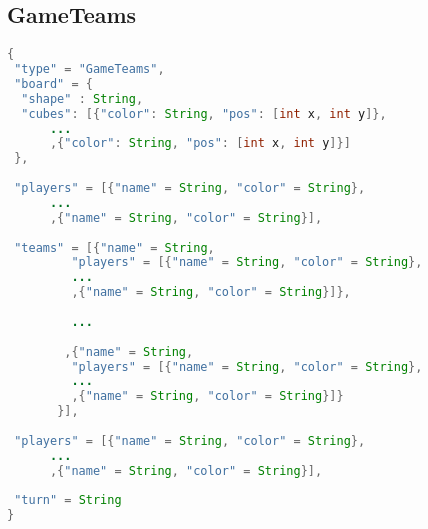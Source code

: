 \documentclass{article}
\begin{document}
\subsection*{GameTeams}
\begin{lstlisting}[frame=single, language=Java]
{
 "type" = "GameTeams",
 "board" = {
  "shape" : String,
  "cubes": [{"color": String, "pos": [int x, int y]},
  	  ...
  	  ,{"color": String, "pos": [int x, int y]}]
 },
 
 "players" = [{"name" = String, "color" = String},
 	  ...
 	  ,{"name" = String, "color" = String}],
 
 "teams" = [{"name" = String,
 	     "players" = [{"name" = String, "color" = String},
 	     ...
 	     ,{"name" = String, "color" = String}]},
 	     
 	     ...
 	     
 	    ,{"name" = String,
 	     "players" = [{"name" = String, "color" = String},
 	     ...
 	     ,{"name" = String, "color" = String}]}
	   }],
	   
 "players" = [{"name" = String, "color" = String},
 	  ...
 	  ,{"name" = String, "color" = String}],
 
 "turn" = String	
}
\end{lstlisting}
\end{document}

